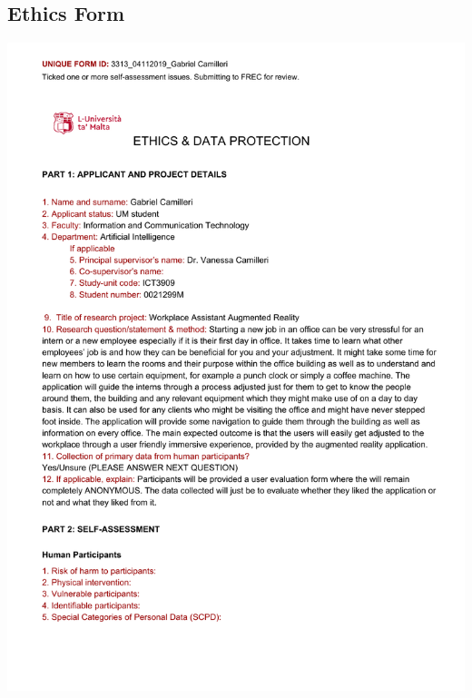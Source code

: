 \documentclass{aifyp}
\begin{document}
\begin{appendices}
\section{Ethics Form}
\includegraphics[scale=0.8]{Forms/EthicsForm.pdf}

% 








\end{appendices}
\end{document}
